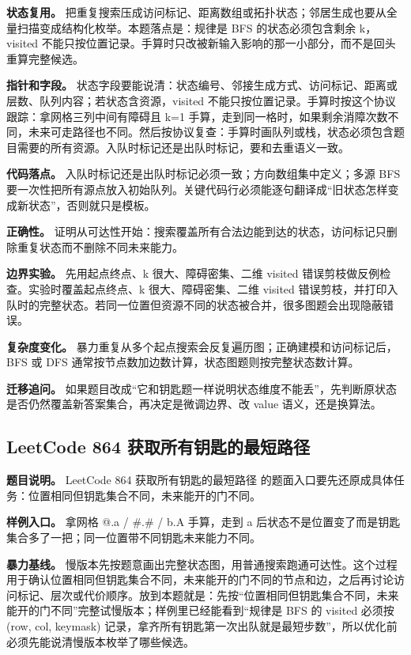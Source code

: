 \textbf{状态复用。} 把重复搜索压成访问标记、距离数组或拓扑状态；邻居生成也要从全量扫描变成结构化枚举。本题落点是：规律是 BFS 的状态必须包含剩余 k，visited 不能只按位置记录。手算时只改被新输入影响的那一小部分，而不是回头重算完整候选。

\textbf{指针和字段。} 状态字段要能说清：状态编号、邻接生成方式、访问标记、距离或层数、队列内容；若状态含资源，visited 不能只按位置记录。手算时按这个协议跟踪：拿网格三列中间有障碍且 k=1 手算，走到同一格时，如果剩余消障次数不同，未来可走路径也不同。然后按协议复查：手算时画队列或栈，状态必须包含题目需要的所有资源。入队时标记还是出队时标记，要和去重语义一致。

\textbf{代码落点。} 入队时标记还是出队时标记必须一致；方向数组集中定义；多源 BFS 要一次性把所有源点放入初始队列。关键代码行必须能逐句翻译成“旧状态怎样变成新状态”，否则就只是模板。

\textbf{正确性。} 证明从可达性开始：搜索覆盖所有合法边能到达的状态，访问标记只删除重复状态而不删除不同未来能力。

\textbf{边界实验。} 先用起点终点、k 很大、障碍密集、二维 visited 错误剪枝做反例检查。实验时覆盖起点终点、k 很大、障碍密集、二维 visited 错误剪枝，并打印入队时的完整状态。若同一位置但资源不同的状态被合并，很多图题会出现隐蔽错误。

\textbf{复杂度变化。} 暴力重复从多个起点搜索会反复遍历图；正确建模和访问标记后，BFS 或 DFS 通常按节点数加边数计算，状态图题则按完整状态数计算。

\textbf{迁移追问。} 如果题目改成“它和钥匙题一样说明状态维度不能丢”，先判断原状态是否仍然覆盖新答案集合，再决定是微调边界、改 value 语义，还是换算法。

\subsection{LeetCode 864 获取所有钥匙的最短路径}

\textbf{题目说明。} LeetCode 864 获取所有钥匙的最短路径 的题面入口要先还原成具体任务：位置相同但钥匙集合不同，未来能开的门不同。

\textbf{样例入口。} 拿网格 @.a / \#.\# / b.A 手算，走到 a 后状态不是位置变了而是钥匙集合多了一把；同一位置带不同钥匙未来能力不同。

\textbf{暴力基线。} 慢版本先按题意画出完整状态图，用普通搜索跑通可达性。这个过程用于确认位置相同但钥匙集合不同，未来能开的门不同的节点和边，之后再讨论访问标记、层次或代价顺序。放到本题就是：先按“位置相同但钥匙集合不同，未来能开的门不同”完整试慢版本；样例里已经能看到“规律是 BFS 的 visited 必须按 (row, col, keymask) 记录，拿齐所有钥匙第一次出队就是最短步数”，所以优化前必须先能说清慢版本枚举了哪些候选。

